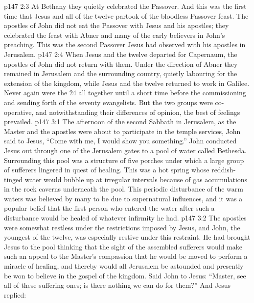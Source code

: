 \vs p147 2:3 At Bethany they quietly celebrated the Passover. And this was the first time that Jesus and all of the twelve partook of the bloodless Passover feast. The apostles of John did not eat the Passover with Jesus and his apostles; they celebrated the feast with Abner and many of the early believers in John’s preaching. This was the second Passover Jesus had observed with his apostles in Jerusalem.
\vs p147 2:4 When Jesus and the twelve departed for Capernaum, the apostles of John did not return with them. Under the direction of Abner they remained in Jerusalem and the surrounding country, quietly labouring for the extension of the kingdom, while Jesus and the twelve returned to work in Galilee. Never again were the 24 all together until a short time before the commissioning and sending forth of the seventy evangelists. But the two groups were co\hyp{}operative, and notwithstanding their differences of opinion, the best of feelings prevailed.
\vs p147 3:1 The afternoon of the second Sabbath in Jerusalem, as the Master and the apostles were about to participate in the temple services, John said to Jesus, “Come with me, I would show you something.” John conducted Jesus out through one of the Jerusalem gates to a pool of water called Bethesda. Surrounding this pool was a structure of five porches under which a large group of sufferers lingered in quest of healing. This was a hot spring whose reddish\hyp{}tinged water would bubble up at irregular intervals because of gas accumulations in the rock caverns underneath the pool. This periodic disturbance of the warm waters was believed by many to be due to supernatural influences, and it was a popular belief that the first person who entered the water after such a disturbance would be healed of whatever infirmity he had.
\vs p147 3:2 The apostles were somewhat restless under the restrictions imposed by Jesus, and John, the youngest of the twelve, was especially restive under this restraint. He had brought Jesus to the pool thinking that the sight of the assembled sufferers would make such an appeal to the Master’s compassion that he would be moved to perform a miracle of healing, and thereby would all Jerusalem be astounded and presently be won to believe in the gospel of the kingdom. Said John to Jesus: “Master, see all of these suffering ones; is there nothing we can do for them?” And Jesus replied: 
